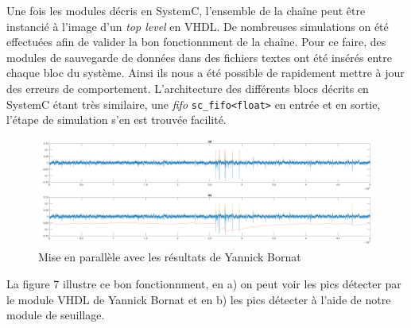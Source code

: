 \documentclass[a4paper,12pt]{article}
\begin{document}
Une fois les modules décris en SystemC, l'ensemble de la chaîne peut être instancié à l'image d'un \textit{top level} en VHDL. De nombreuses simulations on été effectuées afin de valider la bon fonctionnment de la chaîne. Pour ce faire, des modules de sauvegarde de données dans des fichiers textes ont été insérés entre chaque bloc du système. Ainsi ils nous a été possible de rapidement mettre à jour des erreurs de comportement. L'architecture des différents blocs décrits en SystemC étant très similaire, une \textit{fifo} \texttt{sc\_fifo<float>} en entrée et en sortie, l'étape de simulation s'en est trouvée facilité.

\begin{figure}[H]
\centering
\includegraphics[scale =0.18, keepaspectratio]{results.png}
\caption{Mise en parallèle avec les résultats de Yannick Bornat}
\end{figure}
La figure 7 illustre ce bon fonctionnment, en a) on peut voir les pics détecter par le module VHDL de Yannick Bornat et en b) les pics détecter à l'aide de notre module de seuillage.
\end{document}
